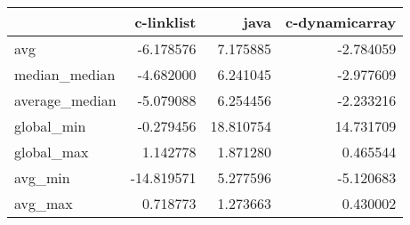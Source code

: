 \begin{tabular}{lrrr}
\toprule
{} &  c-linklist &       java &  c-dynamicarray \\
\midrule
avg            &   -6.178576 &   7.175885 &       -2.784059 \\
median\_median  &   -4.682000 &   6.241045 &       -2.977609 \\
average\_median &   -5.079088 &   6.254456 &       -2.233216 \\
global\_min     &   -0.279456 &  18.810754 &       14.731709 \\
global\_max     &    1.142778 &   1.871280 &        0.465544 \\
avg\_min        &  -14.819571 &   5.277596 &       -5.120683 \\
avg\_max        &    0.718773 &   1.273663 &        0.430002 \\
\bottomrule
\end{tabular}
